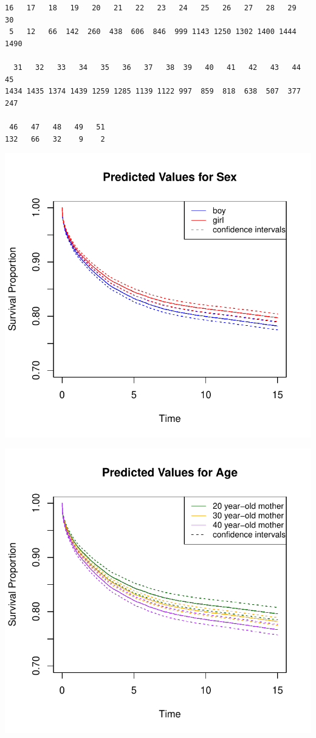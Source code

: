 \documentclass[12pt,letterpaper]{article}
\begin{document}
\newpage

\begin{BVerbatim}
16   17   18   19   20   21   22   23   24   25   26   27   28   29   30
 5   12   66  142  260  438  606  846  999 1143 1250 1302 1400 1444 1490

  31   32   33   34   35   36   37   38  39   40   41   42   43   44   45 
1434 1435 1374 1439 1259 1285 1139 1122 997  859  818  638  507  377  247

 46   47   48   49   51
132   66   32    9    2 
\end{BVerbatim}

\includegraphics{plot2.pdf}

\newpage

\includegraphics{plot3.pdf}
\end{document}
